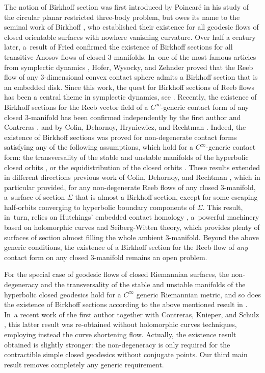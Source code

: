 \documentclass[JEP,XML,SOM,Unicode,NoFloatCountersInSection,published]{cedram}
\theoremstyle{plain}
\theoremstyle{definition}
\begin{document}
The notion of Birkhoff section was first introduced by Poincaré in his study of the circular planar restricted three-body problem, but owes its name to the seminal work of Birkhoff \cite{Birkhoff:1917aa}, who established their existence for all geodesic flows of closed orientable surfaces with nowhere vanishing curvature. Over half a century later, a~result of Fried \cite{Fried:1983aa} confirmed the existence of Birkhoff sections for all transitive Anosov flows of closed 3-manifolds. In~one of the most famous articles from symplectic dynamics \cite{Hofer:1998aa}, Hofer, Wysocky, and Zehnder proved that the Reeb flow of any 3-dimensional convex contact sphere admits a Birkhoff section that is an embedded disk. Since this work, the quest for Birkhoff sections of Reeb flows has been a central theme in symplectic dynamics, see \eg \cite{Salomao:2018aa, Hryniewicz:2023aa}. Recently, the existence of Birkhoff sections for the Reeb vector field of a $C^\infty$-generic contact form of any closed 3\nobreakdash-manifold has been confirmed independently by the first author and Contreras \cite{Contreras:2022aa}, and by Colin, Dehornoy, Hryniewicz, and Rechtman \cite{Colin:2024aa}. Indeed, the existence of Birkhoff sections was proved for non-degenerate contact forms satisfying any of the following assumptions, which hold for a $C^\infty$-generic contact form: the transversality of the stable and unstable manifolds of the hyperbolic closed orbits \cite{Contreras:2022aa}, or the equidistribution of the closed orbits \cite{Colin:2024aa}. These results extended in different directions previous work of Colin, Dehornoy, and Rechtman \cite{Colin:2023aa}, which in particular provided, for any non-degenerate Reeb flows of any closed 3-manifold, a~surface of section $\Sigma$ that is almost a Birkhoff section, except for some escaping half-orbits converging to hyperbolic boundary components of $\Sigma$. This result, in~turn, relies on Hutchings' embedded contact homology \cite{Hutchings:2014vp}, a~powerful machinery based on holomorphic curves and Seiberg-Witten theory, which provides plenty of surfaces of section almost filling the whole ambient 3-manifold. Beyond the above generic conditions, the existence of a Birkhoff section for the Reeb flow of \emph{any} contact form on any closed 3-manifold remains an open problem.

For the special case of geodesic flows of closed Riemannian surfaces, the non-degeneracy and the transversality of the stable and unstable manifolds of the hyperbolic closed geodesics hold for a $C^\infty$ generic Riemannian metric, and so does the existence of Birkhoff sections according to the above mentioned result in \cite{Contreras:2022aa}. In~a recent work of the first author together with Contreras, Knieper, and Schulz \cite{Contreras:2022ab}, this latter result was re-obtained without holomorphic curves techniques, employing instead the curve shortening flow. Actually, the existence result obtained is slightly stronger: the non-degeneracy is only required for the contractible simple closed geodesics without conjugate points. Our third main result removes completely any generic requirement.
\end{document}
